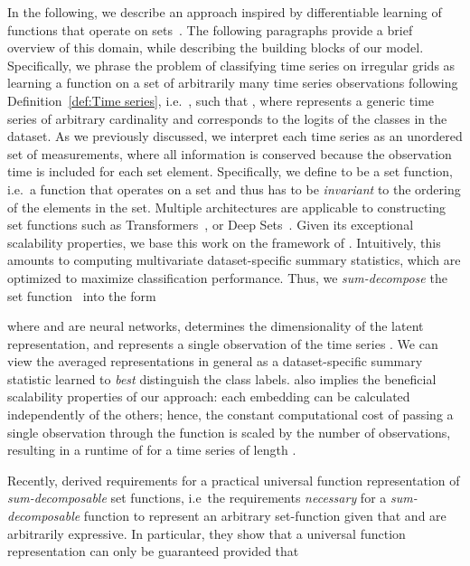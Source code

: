 \documentclass{article}
\begin{document}
In the following, we describe an approach inspired by differentiable learning of
functions that operate on sets~\citep{zaheer2017deep, Wagstaff2019}. The
following paragraphs provide a brief overview of this domain, while
describing the building blocks of our model.
Specifically, we  phrase the problem of classifying time series on irregular grids as learning
a function  on a set of arbitrarily many time series observations following
Definition~\ref{def:Time series}, i.e.\
,
such that
,
where  represents a generic time series of arbitrary
cardinality and  corresponds to the logits of the 
classes in the dataset.
As we previously discussed, we interpret each time series as an unordered set of
measurements, where all information is conserved because the observation
time is included for each set element. Specifically, we define  to be
a set function, i.e.\ a function that operates on a set and thus has to be
\emph{invariant} to the ordering of the elements in the set.
Multiple architectures are applicable to constructing set functions such as
Transformers~\citep{lee2019set, vaswani2017attention}, or Deep
Sets~\citep{zaheer2017deep}. Given its exceptional scalability
properties, we base this work on the framework of
\citet{zaheer2017deep}. Intuitively, this amounts to computing
multivariate dataset-specific summary statistics, which are optimized to
maximize classification performance. Thus, we \emph{sum-decompose} the
set function~ into the form

where  and  are
neural networks,  determines the
dimensionality of the latent representation, and 
represents a single observation of the time series .
We can view the averaged representations  in general as a dataset-specific summary
statistic learned to \emph{best} distinguish the class labels.
 also implies the beneficial
scalability properties of our approach: each embedding can be
calculated independently of the others; hence, the constant
computational cost of passing a single observation through the
function  is scaled by the number of observations, resulting in
a runtime of  for a time series of length .

Recently, \citet{Wagstaff2019} derived requirements for a practical universal
function representation of \emph{sum-decomposable} set functions, i.e\ the
requirements \emph{necessary} for a \emph{sum-decomposable} function to
represent an arbitrary set-function given that  and  are arbitrarily
expressive.  In particular, they show that a universal function representation
can only be guaranteed provided that
\end{document}
